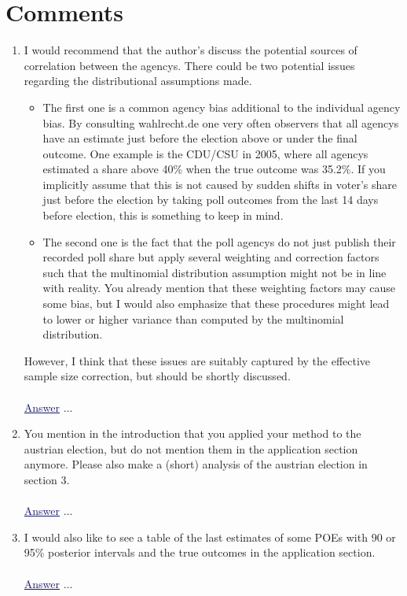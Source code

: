 \documentclass{scrartcl}
\newcommand{\blue}[1]{\textcolor{MidnightBlue}{\underline{\textcolor{MidnightBlue}{#1}}}}
\begin{document}
\section*{Comments}
\begin{enumerate}
  \item I would recommend that the author's discuss the potential sources of correlation between the agencys. There could be two potential issues regarding the 
  distributional assumptions made.
  \begin{itemize}
    \item The first one is a common agency bias additional to the individual agency bias. By consulting wahlrecht.de one very often observers that all agencys have an estimate just before the election above or under the final outcome. One example is the CDU/CSU in 2005, where all agencys estimated a share above 40\% when the true outcome was 35.2\%. If you implicitly assume that this is not caused by sudden shifts in voter's share just before the election by taking poll outcomes from the last 14 days before election, this is something to keep in mind.
    \item The second one is the fact that the poll agencys do not just publish their recorded poll share but apply several weighting and correction factors such that the multinomial distribution assumption might not be in line with reality. You already mention that these weighting factors may cause some bias, but I would also emphasize that these procedures might lead to lower or higher variance than computed by the multinomial distribution.
  \end{itemize}
  However, I think that these issues are suitably captured by the effective sample size correction, but should be shortly discussed.
  \\ \\
  \blue{Answer} ...

  \item You mention in the introduction that you applied your method to the austrian election, but do not mention them in the application section anymore. Please also make a (short) analysis of the austrian election in section 3.
  \\ \\
  \blue{Answer} ...

  \item I would also like to see a table of the last estimates of some POEs with 90 or 95\% posterior intervals and the true outcomes in the application section.
  \\ \\
  \blue{Answer} ...
\end{enumerate}
\end{document}

